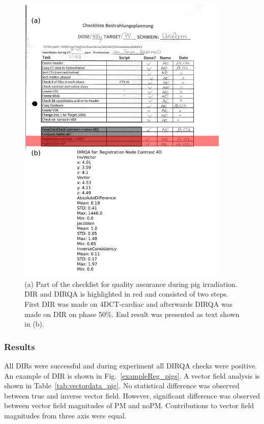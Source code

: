 \documentclass[type=dr, dr=rernat, accentcolor=tud7b,colorbacktitle, bigchapter, openright, twoside, 12pt ]{tudthesis}
\begin{document}
\newpage
\begin{figure}[H]
	\begin{center}		
		\includegraphics[width=0.9\textwidth]{./Images/checkList.png}
		\caption{(a) Part of the checklist for quality assurance during pig irradiation. DIR and DIRQA is highlighted in red and consisted of two steps. First DIR was made on 4DCT-cardiac and afterwards DIRQA was made on
		DIR on phase 50\%. End result was presented as text shown in (b).}
		\label{checkList}
	\end{center}
\end{figure}
\newpage

\subsubsection{Results}


All DIRs were successful and during experiment all DIRQA checks were positive. An example of DIR is shown in Fig.~\ref{exampleReg_pigs}. A vector field analysis is shown in Table~\ref{tab:vectordata_pig}. No statistical difference was
observed between true and inverse vector field. However, significant difference was observed between vector field magnitudes of PM and noPM. Contributions to vector field magnitudes from three axis were equal. 
\end{document}
